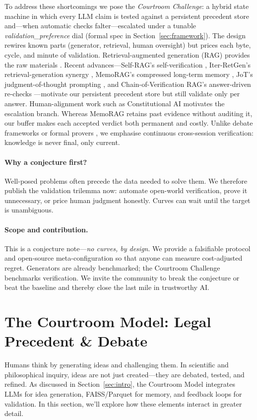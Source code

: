 \documentclass[11pt]{article}
\begin{document}
To address these shortcomings we pose the \textit{Courtroom Challenge}: a
hybrid state machine in which every LLM claim is tested against a persistent
precedent store and—when automatic checks falter—escalated under a
tunable \textit{validation\_preference} dial (formal spec in
Section~\ref{sec:framework}).  The design rewires known parts
(generator, retrieval, human oversight) but prices each byte, cycle,
and minute of validation.  Retrieval-augmented generation (RAG) provides the raw materials
\citep{lewis2020rag,fan2024ragsurvey}.  
Recent advances—Self-RAG's self-verification \citep{asai2024selfrag}, 
Iter-RetGen's retrieval-generation synergy \citep{shao2023iterretgen}, 
MemoRAG's compressed long-term memory \citep{qian2024memorag}, JoT's judgment-of-thought prompting \citep{park2025judgment}, 
and Chain-of-Verification RAG's answer-driven re-checks \citep{he2024covrag}—motivate 
our persistent precedent store but still validate only per answer.  
Human-alignment work such as Constitutional AI 
\citep{bai2022constitutional} motivates the escalation branch.  
Whereas MemoRAG retains past evidence without auditing it, our buffer makes
each accepted verdict both permanent and costly.
Unlike debate frameworks \citep{chen2024reconcile,madaan2023selfrefine} or formal
provers \citep{wang2025malot}, we emphasise continuous cross-session
verification: knowledge is never final, only current.

\paragraph{Why a conjecture first?}
Well-posed problems often precede the data needed to solve them.  We
therefore publish the validation trilemma now: automate open-world
verification, prove it unnecessary, or price human judgment honestly.
Curves can wait until the target is unambiguous.

\paragraph{Scope and contribution.}
This is a conjecture note—\emph{no curves, by design}.  We provide a
falsifiable protocol and open-source meta-configuration so that anyone can
measure cost-adjusted regret.  Generators are already benchmarked; the
Courtroom Challenge benchmarks verification.  We invite the community
to break the conjecture or beat the baseline and thereby close the last
mile in trustworthy AI.

\section{The Courtroom Model: Legal Precedent \& Debate}
\label{sec:courtroom}
Humans think by generating ideas and challenging them. In scientific and philosophical inquiry, ideas are not just created—they are debated, tested, and refined. As discussed in Section~\ref{sec:intro}, the Courtroom Model integrates LLMs for idea generation, FAISS/Parquet for memory, and feedback loops for validation. In this section, we'll explore how these elements interact in greater detail.
\end{document}

